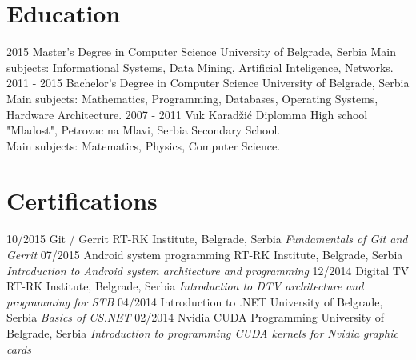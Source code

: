 \documentclass[]{rankovic-cv}
\begin{document}
\section{Education}
\begin{entrylist}
  \entry
    {2015}
    {Master's Degree in Computer Science}
    {University of Belgrade, Serbia}
    {Main subjects: Informational Systems, Data Mining, Artificial Inteligence, Networks.}
  \entry
    {2011 - 2015}
    {Bachelor's Degree in Computer Science}
    {University of Belgrade, Serbia}
    {Main subjects: Mathematics, Programming, Databases, Operating Systems, Hardware Architecture.}
  \entry
    {2007 - 2011}
    {Vuk Karadžić Diplomma}
    {High school "Mladost", Petrovac na Mlavi, Serbia}
    {Secondary School.\\
    Main subjects: Matematics, Physics, Computer Science.}
\end{entrylist}

\section{Certifications}
\begin{entrylist}
  \entry
    {10/2015}
    {Git / Gerrit}
    {RT-RK Institute, Belgrade, Serbia}
    {\emph{Fundamentals of Git and Gerrit}}
  \entry
    {07/2015}
    {Android system programming}
    {RT-RK Institute, Belgrade, Serbia}
    {\emph{Introduction to Android system architecture and programming}}
  \entry
    {12/2014}
    {Digital TV}
    {RT-RK Institute, Belgrade, Serbia}
    {\emph{Introduction to DTV architecture and programming for STB}}
  \entry
    {04/2014}
    {Introduction to .NET }
    {University of Belgrade, Serbia}
    {\emph{Basics of CS.NET}}
  \entry
    {02/2014}
    {Nvidia CUDA Programming}
    {University of Belgrade, Serbia}
    {\emph{Introduction to programming CUDA kernels for Nvidia graphic cards}}
\end{entrylist}
\end{document}
